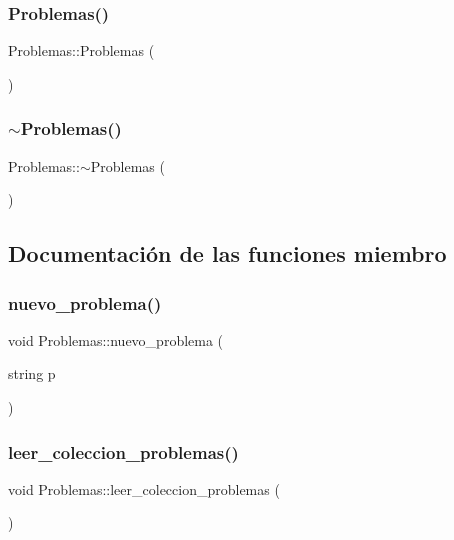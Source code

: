 \subsubsection{\texorpdfstring{Problemas()}{Problemas()}}
{\footnotesize\ttfamily Problemas\+::\+Problemas (\begin{DoxyParamCaption}{ }\end{DoxyParamCaption})}

\mbox{\label{class_problemas_aec05a82a712fee2327b6e3f6ce7b4e65}} 
\subsubsection{\texorpdfstring{$\sim$\+Problemas()}{~Problemas()}}
{\footnotesize\ttfamily Problemas\+::$\sim$\+Problemas (\begin{DoxyParamCaption}{ }\end{DoxyParamCaption})}



\subsection{Documentación de las funciones miembro}
\mbox{\label{class_problemas_a1cebce2784b951482651d299be50d8b3}} 
\subsubsection{\texorpdfstring{nuevo\+\_\+problema()}{nuevo\_problema()}}
{\footnotesize\ttfamily void Problemas\+::nuevo\+\_\+problema (\begin{DoxyParamCaption}\item[{string}]{p }\end{DoxyParamCaption})}

\mbox{\label{class_problemas_a6d16937dea64409081e507065e17f2b1}} 
\subsubsection{\texorpdfstring{leer\+\_\+coleccion\+\_\+problemas()}{leer\_coleccion\_problemas()}}
{\footnotesize\ttfamily void Problemas\+::leer\+\_\+coleccion\+\_\+problemas (\begin{DoxyParamCaption}{ }\end{DoxyParamCaption})}

